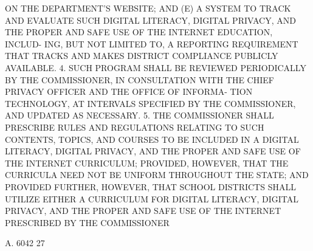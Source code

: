  ON THE DEPARTMENT'S WEBSITE; AND
   (E) A SYSTEM TO TRACK AND  EVALUATE  SUCH  DIGITAL  LITERACY,  DIGITAL
 PRIVACY,  AND THE PROPER AND SAFE USE OF THE INTERNET EDUCATION, INCLUD-
 ING, BUT NOT LIMITED TO, A REPORTING REQUIREMENT THAT TRACKS  AND  MAKES
 DISTRICT COMPLIANCE PUBLICLY AVAILABLE.
   4. SUCH PROGRAM SHALL BE REVIEWED PERIODICALLY BY THE COMMISSIONER, IN
 CONSULTATION  WITH  THE CHIEF PRIVACY OFFICER AND THE OFFICE OF INFORMA-
 TION TECHNOLOGY, AT INTERVALS SPECIFIED BY THE COMMISSIONER, AND UPDATED
 AS NECESSARY.
   5. THE COMMISSIONER SHALL PRESCRIBE RULES AND REGULATIONS RELATING  TO
 SUCH CONTENTS, TOPICS, AND COURSES TO BE INCLUDED IN A DIGITAL LITERACY,
 DIGITAL PRIVACY, AND THE PROPER AND SAFE USE OF THE INTERNET CURRICULUM;
 PROVIDED, HOWEVER, THAT THE CURRICULA NEED NOT BE UNIFORM THROUGHOUT THE
 STATE;  AND  PROVIDED  FURTHER,  HOWEVER,  THAT  SCHOOL  DISTRICTS SHALL
 UTILIZE EITHER A CURRICULUM FOR DIGITAL LITERACY, DIGITAL  PRIVACY,  AND
 THE  PROPER  AND SAFE USE OF THE INTERNET PRESCRIBED BY THE COMMISSIONER

 A. 6042                            27

